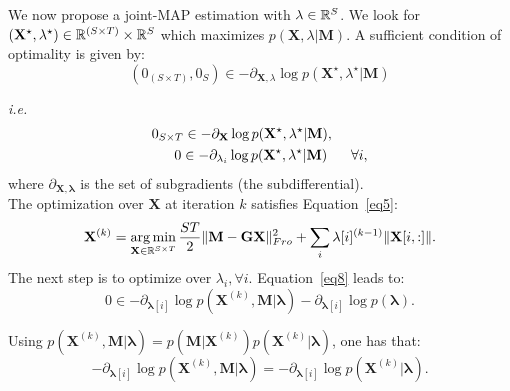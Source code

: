 We now propose a joint-MAP estimation with $\lambda\in\mathbb{R}^S$.
We look for $(\mathbf{X}^\star, \lambda^\star) \in\mathbb{R}^{(S\times T)} \times \mathbb{R}^{S}$ which maximizes $p(\mathbf{X}, \lambda|\mathbf{M})$. A sufficient condition of optimality is given by:
\begin{equation} \label{eq7}
(0_{(S\times T)}, 0_{S}) \in -\partial_{\mathbf{X},\lambda} \log p(\mathbf{X^\star}, \lambda^\star|\mathbf{M})
\end{equation}

\textit{i.e.}
\begin{equation} \label{eq8}
\begin{aligned}
0_{S\times T} \in -\partial_{\mathbf{X}} \log p(\mathbf{X^\star}, \lambda^\star|\mathbf{M}), \hspace{9mm} \\
0 \in -\partial_{\lambda_i} \log p(\mathbf{\mathbf{X}^\star}, \lambda^\star|\mathbf{M}) \hspace{6mm} \forall i,
\end{aligned}
\end{equation}
where $\partial_{\mathbf{X},\mathbf{\lambda}}$ is the set of subgradients (the subdifferential).\\

The optimization over $\mathbf{X}$ at iteration $k$ satisfies Equation~\eqref{eq5}: %
\begin{equation*}	
\mathbf{X}^{(k)}=\mathop{\mathrm{arg}\,\mathrm{min}}_{\mathbf{X}\in\mathbb{R}^{S\times T}} \frac{ST}{2}\|\mathbf{M}-\mathbf{GX}\|_{Fro}^2 + \sum_{i} \mathbf{\lambda}[i]^{(k-1)}\|\mathbf{X}[i,:]\|.
\end{equation*}
The next step is to optimize over $\lambda_i, \forall i$. Equation~\eqref{eq8} leads to:
\begin{equation} \label{optimlambda}
0\in -\partial_{\mathbf{\lambda}[i]} \log p(\mathbf{X}^{(k)},\mathbf{M}|\mathbf{\lambda}) -\partial_{\mathbf{\lambda}[i]} \log p(\mathbf{\lambda}).
\end{equation} 

Using $p(\mathbf{X}^{(k)},\mathbf{M}|\mathbf{\lambda})=p(\mathbf{M}|\mathbf{X}^{(k)})p(\mathbf{X}^{(k)}|\mathbf{\lambda})$, one has that:
\begin{equation}
-\partial_{\mathbf{\lambda}[i]} \log p(\mathbf{X}^{(k)}, \mathbf{M}|\mathbf{\lambda}) = -\partial_{\mathbf{\lambda}[i]} \log p(\mathbf{X}^{(k)}|\mathbf{\lambda}).
\end{equation}

